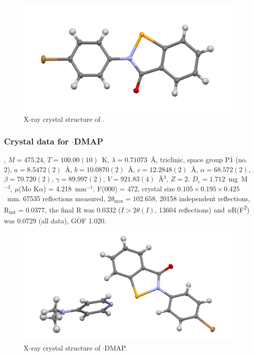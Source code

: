 \begin{refsection}
\begin{figure}
  \includegraphics[width=0.6\linewidth]{Figures/ebs-4br-xtal.pdf}
  \caption{X-ray crystal structure of \texorpdfstring{}{C13 H8 Br N O Se}.}
\end{figure}

\subsubsection{Crystal data for \texorpdfstring{$ \cdot $DMAP}{C20 H18 Br N3 O Se}}
, $M=475.24$, $T=100.00(10)$~K, $ \lambda=0.71073 $~\AA, triclinic, space group P$\bar{1}$ (no. 2), $a = 8.5472(2)$~\AA, $b = 10.0870(2)$~\AA, $c = 12.2848(2)$~\AA, $\alpha = 68.572(2)$\degree, $\beta = 70.720(2)$\degree, $\gamma = 89.997(2)$\degree, $V = 921.83(4)$~\AA$^{3}$, $Z = 2$. $D_{c}= 1.712$~mg~M$^{-3}$, $\mu$(Mo K$\alpha$) = 4.218~mm$^{-1}$, F(000) = 472, crystal size $0.105 \times 0.195 \times 0.425$~mm. 67535 reflections measured, $2\theta_{\max}=102.658$\degree, 20158 independent reflections, R\textsubscript{int} = 0.0377, the final R was 0.0332 ($I > 2\theta(I)$, 13604 reflections) and \textit{w}R(F\textsuperscript{2}) was 0.0729 (all data), GOF 1.020.

\begin{figure}
  \includegraphics[width=0.6\linewidth]{Figures/ebs-4br-dmap-xtal.pdf}
  \caption{X-ray crystal structure of \texorpdfstring{$ \cdot $DMAP}{C20 H18 Br N3 O Se}.}
\end{figure}


\end{refsection}
